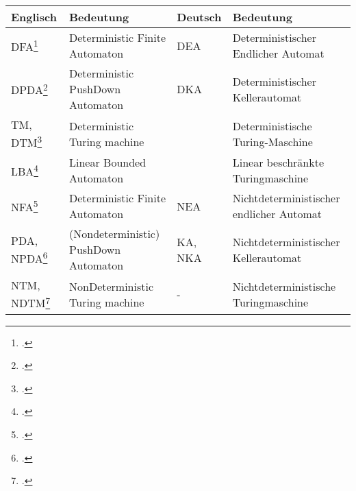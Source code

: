 \documentclass{bschlangaul-theorie}
\begin{document}
\noindent
\begin{tabularx}{\linewidth}{l|X||l|X}
Englisch & Bedeutung & Deutsch & Bedeutung \\\hline\hline

%

DFA\footcite{wiki:dfa} &
Deterministic Finite Automaton &
DEA &
Deterministischer Endlicher Automat\\

%

DPDA\footcite{wiki:dpda} &
Deterministic PushDown Automaton &
DKA &
Deterministischer Kellerautomat \\

%

TM, DTM\footcite{wiki:tm} &
Deterministic Turing machine &
&
Deterministische Turing-Maschine \\

%

LBA\footcite{wiki:lba} &
Linear Bounded Automaton &
&
Linear beschränkte Turingmaschine \\

%

NFA\footcite{wiki:nfa} &
Deterministic Finite Automaton &
NEA &
Nichtdeterministischer endlicher Automat\\

%

PDA, NPDA\footcite{wiki:pda} &
(Nondeterministic) PushDown Automaton &
KA, NKA &
Nichtdeterministischer Kellerautomat \\

%

NTM, NDTM\footcite{wiki:ntm} &
NonDeterministic Turing machine &
- &
Nichtdeterministische Turingmaschine\\
\end{tabularx}

\literatur
\end{document}
